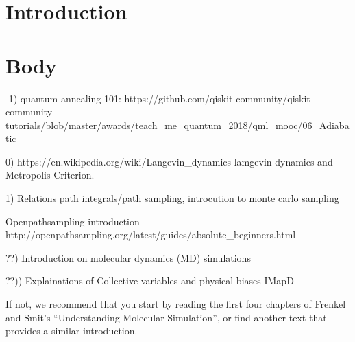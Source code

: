 
\section{Introduction}

\section{Body}

-1)
quantum annealing 101:
https://github.com/qiskit-community/qiskit-community-tutorials/blob/master/awards/teach_me_quantum_2018/qml_mooc/06_Adiabatic%

0) https://en.wikipedia.org/wiki/Langevin_dynamics
lamgevin dynamics and Metropolis Criterion.

1) Relations path integrals/path sampling, introcution to monte carlo sampling

Openpathsampling introduction
http://openpathsampling.org/latest/guides/absolute_beginners.html


??) Introduction on molecular dynamics (MD) simulations

??)) Explainations of Collective variables and physical biases
IMapD

If not, we recommend that you start by reading the first four chapters of Frenkel and Smit’s “Understanding Molecular Simulation”, or find another text that provides a similar introduction.
